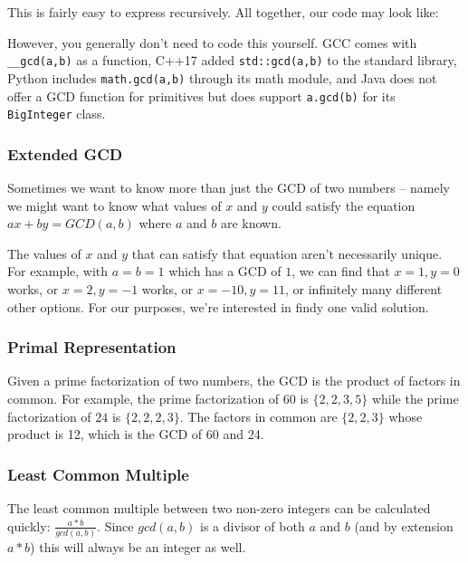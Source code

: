 This is fairly easy to express recursively. All together, our code may look like:


However, you generally don't need to code this yourself. GCC comes with \texttt{__gcd(a,b)} as a function, C++17 added \texttt{std::gcd(a,b)} to the standard library, Python includes \texttt{math.gcd(a,b)} through its math module, and Java does not offer a GCD function for primitives but does support \texttt{a.gcd(b)} for its \texttt{BigInteger} class.

\subsubsection{Extended GCD}

Sometimes we want to know more than just the GCD of two numbers -- namely we might want to know what values of $x$ and $y$ could satisfy the equation $ax + by = GCD(a,b)$ where $a$ and $b$ are known.

The values of $x$ and $y$ that can satisfy that equation aren't necessarily unique. For example, with $a = b = 1$ which has a GCD of $1$, we can find that $x = 1, y = 0$ works, or $x = 2, y = -1$ works, or $x = -10, y = 11$, or infinitely many different other options. For our purposes, we're interested in findy one valid solution.


\subsubsection{Primal Representation}

Given a prime factorization of two numbers, the GCD is the product of factors in common. For example, the prime factorization of $60$ is $\{2,2,3,5\}$ while the prime factorization of $24$ is $\{2,2,2,3\}$. The factors in common are $\{2,2,3\}$ whose product is 12, which is the GCD of 60 and 24.

\subsubsection{Least Common Multiple}

The least common multiple between two non-zero integers can be calculated quickly: $\frac{a * b}{gcd(a, b)}$. Since $gcd(a, b)$ is a divisor of both $a$ and $b$ (and by extension $a * b$) this will always be an integer as well.

